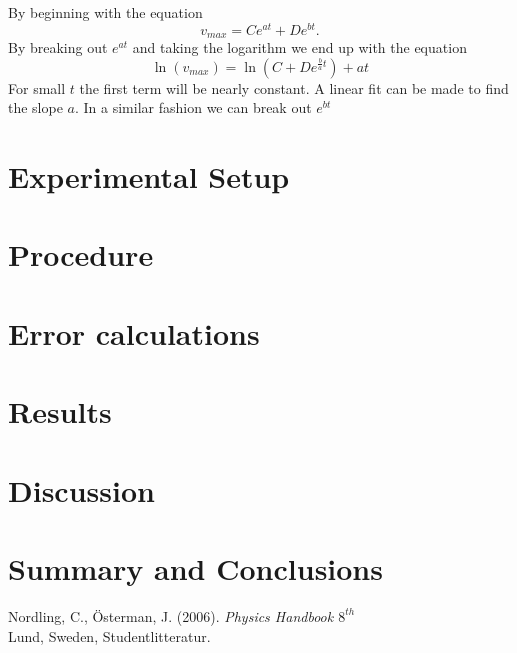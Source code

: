 \documentclass[11pt, a4paper]{article}
\begin{document}
By beginning with the equation
\[
v_{max} = Ce^{at} + De^{bt}.
\]
By breaking out $e^{at}$ and taking the logarithm we end up with the equation
\[
\ln(v_{max}) = \ln(C + De^{\frac{b}{a}t}) + at
\]
For small $t$ the first term will be nearly constant. A linear fit can be made to find the slope $a$.
In a similar fashion we can break out $e^{bt}$

\section{Experimental Setup}
\section{Procedure}
\section{Error calculations}
\section{Results}
\section{Discussion}
\section{Summary and Conclusions}
\vfill

\begin{thebibliography}{99}
	 Nordling, C., Österman, J. (2006). 
  \textit{Physics Handbook  $8^{th}$}\\
  Lund, Sweden, Studentlitteratur.
\end{thebibliography}

\begin{appendix}
\end{appendix}

\end{document}
